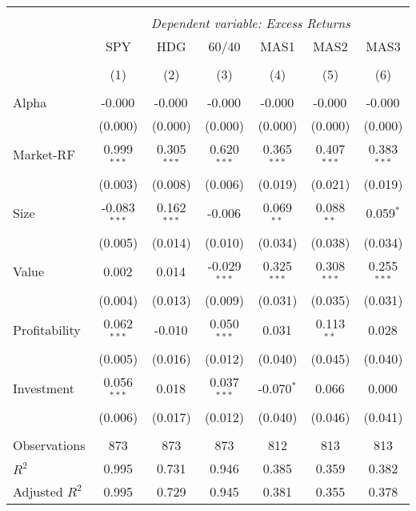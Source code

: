 \begin{table}[!htbp] \centering
\begin{tabular}{@{\extracolsep{5pt}}lcccccc}
\\[-1.8ex]\hline
\hline \\[-1.8ex]
& \multicolumn{6}{c}{\textit{Dependent variable: Excess Returns}} \
\cr \cline{2-7}
\\[-1.8ex] & \multicolumn{1}{c}{SPY} & \multicolumn{1}{c}{HDG} & \multicolumn{1}{c}{60/40} & \multicolumn{1}{c}{MAS1} & \multicolumn{1}{c}{MAS2} & \multicolumn{1}{c}{MAS3}  \\
\\[-1.8ex] & (1) & (2) & (3) & (4) & (5) & (6) \\
\hline \\[-1.8ex]
 Alpha & -0.000$^{}$ & -0.000$^{}$ & -0.000$^{}$ & -0.000$^{}$ & -0.000$^{}$ & -0.000$^{}$ \\
& (0.000) & (0.000) & (0.000) & (0.000) & (0.000) & (0.000) \\
 Market-RF & 0.999$^{***}$ & 0.305$^{***}$ & 0.620$^{***}$ & 0.365$^{***}$ & 0.407$^{***}$ & 0.383$^{***}$ \\
& (0.003) & (0.008) & (0.006) & (0.019) & (0.021) & (0.019) \\
 Size & -0.083$^{***}$ & 0.162$^{***}$ & -0.006$^{}$ & 0.069$^{**}$ & 0.088$^{**}$ & 0.059$^{*}$ \\
& (0.005) & (0.014) & (0.010) & (0.034) & (0.038) & (0.034) \\
 Value & 0.002$^{}$ & 0.014$^{}$ & -0.029$^{***}$ & 0.325$^{***}$ & 0.308$^{***}$ & 0.255$^{***}$ \\
& (0.004) & (0.013) & (0.009) & (0.031) & (0.035) & (0.031) \\
 Profitability & 0.062$^{***}$ & -0.010$^{}$ & 0.050$^{***}$ & 0.031$^{}$ & 0.113$^{**}$ & 0.028$^{}$ \\
& (0.005) & (0.016) & (0.012) & (0.040) & (0.045) & (0.040) \\
 Investment & 0.056$^{***}$ & 0.018$^{}$ & 0.037$^{***}$ & -0.070$^{*}$ & 0.066$^{}$ & 0.000$^{}$ \\
& (0.006) & (0.017) & (0.012) & (0.040) & (0.046) & (0.041) \\
\hline \\[-1.8ex]
 Observations & 873 & 873 & 873 & 812 & 813 & 813 \\
 $R^2$ & 0.995 & 0.731 & 0.946 & 0.385 & 0.359 & 0.382 \\
 Adjusted $R^2$ & 0.995 & 0.729 & 0.945 & 0.381 & 0.355 & 0.378 \\

\end{tabular}
\end{table}
